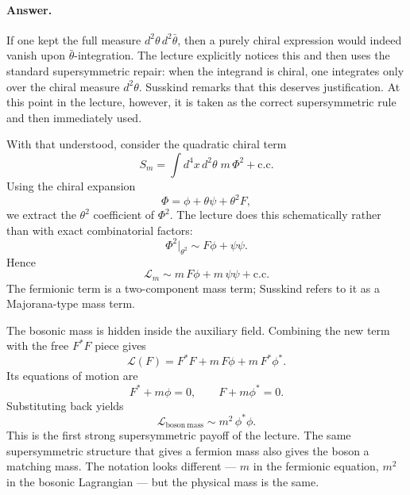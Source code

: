 \paragraph{Answer.} If one kept the full measure \(d^2\theta\,d^2\bar\theta\), then a purely chiral expression would indeed vanish upon \(\bar\theta\)-integration. The lecture explicitly notices this and then uses the standard supersymmetric repair: when the integrand is chiral, one integrates only over the chiral measure \(d^2\theta\). Susskind remarks that this deserves justification. At this point in the lecture, however, it is taken as the correct supersymmetric rule and then immediately used.

With that understood, consider the quadratic chiral term
\begin{equation}
S_m=\int d^4x\,d^2\theta\;m\,\Phi^2+\mathrm{c.c.}
\end{equation}
Using the chiral expansion
\begin{equation}
\Phi=\phi+\theta\psi+\theta^2F,
\end{equation}
we extract the \(\theta^2\) coefficient of \(\Phi^2\). The lecture does this schematically rather than with exact combinatorial factors:
\begin{equation}
\Phi^2\big|_{\theta^2}\sim F\phi+\psi\psi.
\end{equation}
Hence
\begin{equation}
\mathcal L_m\sim m\,F\phi + m\,\psi\psi + \mathrm{c.c.}
\end{equation}
The fermionic term is a two-component mass term; Susskind refers to it as a Majorana-type mass term.

The bosonic mass is hidden inside the auxiliary field. Combining the new term with the free \(F^\ast F\) piece gives
\begin{equation}
\mathcal L(F)
=
F^\ast F
+
m\,F\phi
+
m\,F^\ast\phi^\ast.
\end{equation}
Its equations of motion are
\begin{equation}
F^\ast + m\phi =0,
\qquad
F + m\phi^\ast =0.
\end{equation}
Substituting back yields
\begin{equation}
\mathcal L_{\mathrm{boson\ mass}}\sim m^2\,\phi^\ast\phi.
\end{equation}
This is the first strong supersymmetric payoff of the lecture. The same supersymmetric structure that gives a fermion mass also gives the boson a matching mass. The notation looks different --- \(m\) in the fermionic equation, \(m^2\) in the bosonic Lagrangian --- but the physical mass is the same.

